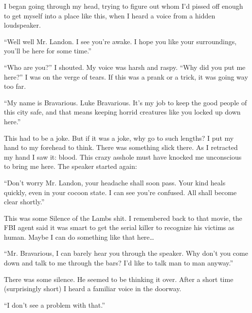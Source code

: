 I began going through my head, trying to figure out whom I'd
pissed off enough to get myself into a place like this, when I
heard a voice from a hidden loudspeaker.



``Well well Mr. Landon. I see you're awake. I hope you
like your surroundings, you'll be here for some
time.''



``Who are you?'' I shouted. My voice was harsh and raspy.
``Why did you put me here?'' I was on the verge of tears.
If this was a prank or a trick, it was going way too far.



``My name is Bravarious. Luke Bravarious. It's my job to
keep the good people of this city safe, and that means keeping
horrid creatures like you locked up down here.''



This had to be a joke. But if it was a joke, why go to such
lengths? I put my hand to my forehead to think. There was something
slick there. As I retracted my hand I saw it: blood. This crazy
asshole must have knocked me unconscious to bring me here. The
speaker started again:



``Don't worry Mr. Landon, your headache shall soon pass.
Your kind heals quickly, even in your cocoon state. I can see
you're confused. All shall become clear shortly.''



This was some Silence of the Lambs shit. I remembered back to that
movie, the FBI agent said it was smart to get the serial killer to
recognize his victims as human. Maybe I can do something like that
here{\ldots}



``Mr. Bravarious, I can barely hear you through the speaker.
Why don't you come down and talk to me through the bars?
I'd like to talk man to man anyway.''



There was some silence. He seemed to be thinking it over. After a
short time (surprisingly short) I heard a familiar voice in the
doorway.



``I don't see a problem with that.'' 

 





